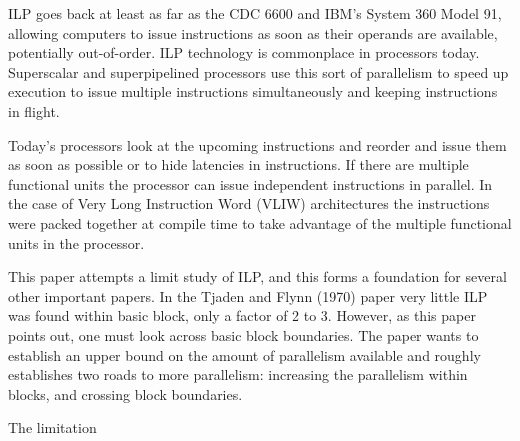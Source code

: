 \documentclass[12pt,twoside,letterpaper]{article}
\begin{document}
ILP goes back at least as far as the CDC 6600 and IBM’s System 360 Model 91, allowing computers to issue instructions as soon as their operands are available, potentially out-of-order. ILP technology is commonplace in processors today. Superscalar and superpipelined processors use this sort of parallelism to speed up execution to issue multiple instructions simultaneously and keeping instructions in flight.

Today’s processors look at the upcoming instructions and reorder and issue them as soon as possible or to hide latencies in instructions. If there are multiple functional units the processor can issue independent instructions in parallel. In the case of Very Long Instruction Word (VLIW) architectures the instructions were packed together at compile time to take advantage of the multiple functional units in the processor.

This paper attempts a limit study of ILP, and this forms a foundation for several other important papers. In the Tjaden and Flynn (1970) paper very little ILP was found within basic block, only a factor of 2 to 3. However, as this paper points out, one must look across basic block boundaries. The paper wants to establish an upper bound on the amount of parallelism available and roughly establishes two roads to more parallelism: increasing the parallelism within blocks, and crossing block boundaries.

The limitation 
\end{document}
